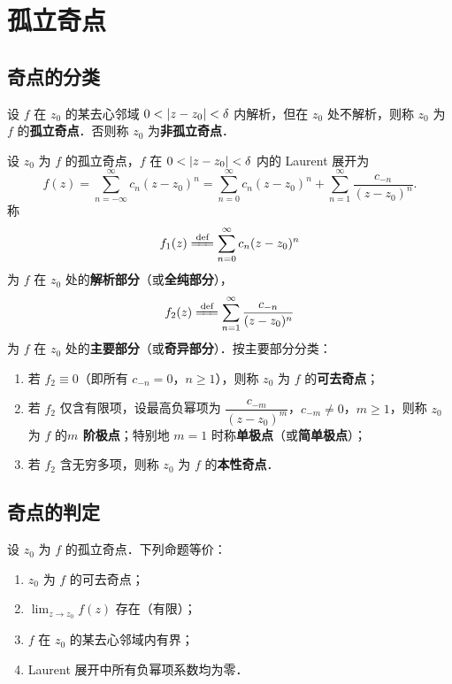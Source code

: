 \documentclass[12pt, a4paper, oneside, UTF8]{ctexbook}
\begin{document}
\section{孤立奇点}

\subsection{奇点的分类}
\begin{definition}[孤立奇点]
设 $f$ 在 $z_0$ 的某去心邻域 $0<\abs{z-z_0}<\delta$ 内解析，但在 $z_0$ 处不解析，则称 $z_0$ 为 $f$ 的\textbf{孤立奇点}．否则称 $z_0$ 为\textbf{非孤立奇点}．
\end{definition}

\begin{definition}[奇点类型的分类]
设 $z_0$ 为 $f$ 的孤立奇点，$f$ 在 $0<\abs{z-z_0}<\delta$ 内的 Laurent 展开为
\[
f(z) = \sum_{n=-\infty}^{\infty} c_n (z-z_0)^n = \sum_{n=0}^{\infty} c_n(z-z_0)^n + \sum_{n=1}^{\infty}\frac{c_{-n}}{(z-z_0)^n}.
\]
称
\[
f_1(z) \defeq \sum_{n=0}^{\infty} c_n(z-z_0)^n
\]
为 $f$ 在 $z_0$ 处的\textbf{解析部分}（或\textbf{全纯部分}），
\[
f_2(z) \defeq \sum_{n=1}^{\infty}\frac{c_{-n}}{(z-z_0)^n}
\]
为 $f$ 在 $z_0$ 处的\textbf{主要部分}（或\textbf{奇异部分}）．按主要部分分类：
\begin{enumerate}
    \item 若 $f_2\equiv 0$（即所有 $c_{-n}=0$，$n\ge 1$），则称 $z_0$ 为 $f$ 的\textbf{可去奇点}；
    \item 若 $f_2$ 仅含有限项，设最高负幂项为 $\dfrac{c_{-m}}{(z-z_0)^m}$，$c_{-m}\neq 0$，$m\ge 1$，则称 $z_0$ 为 $f$ 的\textbf{$m$ 阶极点}；特别地 $m=1$ 时称\textbf{单极点}（或\textbf{简单极点}）；
    \item 若 $f_2$ 含无穷多项，则称 $z_0$ 为 $f$ 的\textbf{本性奇点}．
\end{enumerate}
\end{definition}

\subsection{奇点的判定}

\begin{theorem}[可去奇点的判别法]
设 $z_0$ 为 $f$ 的孤立奇点．下列命题等价：
\begin{enumerate}
    \item $z_0$ 为 $f$ 的可去奇点；
    \item $\displaystyle\lim_{z\to z_0} f(z)$ 存在（有限）；
    \item $f$ 在 $z_0$ 的某去心邻域内有界；
    \item Laurent 展开中所有负幂项系数均为零．
\end{enumerate}
\end{theorem}
\end{document}
